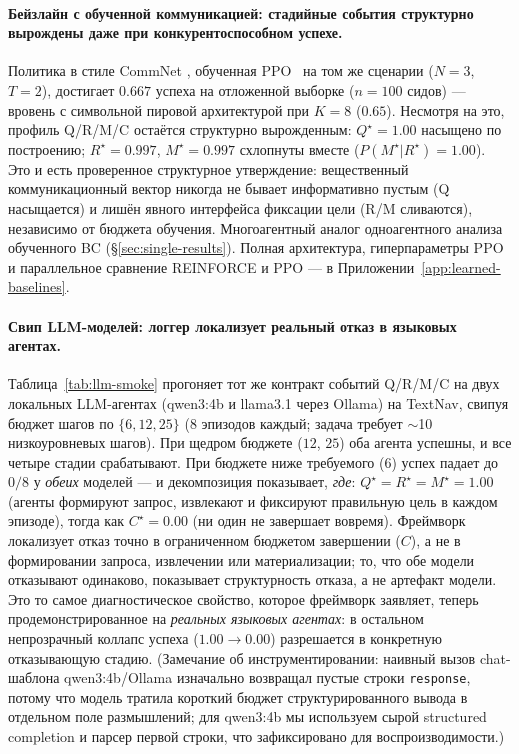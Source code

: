 \documentclass{article}
\begin{document}
\paragraph{Бейзлайн с обученной коммуникацией: стадийные события структурно вырождены даже при конкурентоспособном успехе.}
Политика в стиле CommNet \citep{sukhbaatar2016commnet}, обученная PPO~\citep{schulman2017proximal} на том же сценарии ($N{=}3$, $T{=}2$), достигает $0.667$ успеха на отложенной выборке ($n{=}100$ сидов) --- вровень с символьной пировой архитектурой при $K{=}8$ ($0.65$). Несмотря на это, профиль Q/R/M/C остаётся структурно вырожденным: $Q^\star{=}1.00$ насыщено по построению; $R^\star{=}0.997$, $M^\star{=}0.997$ схлопнуты вместе ($P(M^\star|R^\star){=}1.00$). Это и есть проверенное структурное утверждение: вещественный коммуникационный вектор никогда не бывает информативно пустым (Q насыщается) и лишён явного интерфейса фиксации цели (R/M сливаются), независимо от бюджета обучения. Многоагентный аналог одноагентного анализа обученного BC (\S\ref{sec:single-results}). Полная архитектура, гиперпараметры PPO и параллельное сравнение REINFORCE и PPO --- в Приложении~\ref{app:learned-baselines}.

\paragraph{Свип LLM-моделей: логгер локализует реальный отказ в языковых агентах.}
Таблица~\ref{tab:llm-smoke} прогоняет тот же контракт событий Q/R/M/C на двух локальных LLM-агентах (qwen3:4b и llama3.1 через Ollama) на TextNav, свипуя бюджет шагов по $\{6,12,25\}$ ($8$ эпизодов каждый; задача требует $\sim$10 низкоуровневых шагов). При щедром бюджете ($12$, $25$) оба агента успешны, и все четыре стадии срабатывают. При бюджете ниже требуемого ($6$) успех падает до $0/8$ у \emph{обеих} моделей --- и декомпозиция показывает, \emph{где}: $Q^\star{=}R^\star{=}M^\star{=}1.00$ (агенты формируют запрос, извлекают и фиксируют правильную цель в каждом эпизоде), тогда как $C^\star{=}0.00$ (ни один не завершает вовремя). Фреймворк локализует отказ точно в ограниченном бюджетом завершении ($C$), а не в формировании запроса, извлечении или материализации; то, что обе модели отказывают одинаково, показывает структурность отказа, а не артефакт модели. Это то самое диагностическое свойство, которое фреймворк заявляет, теперь продемонстрированное на \emph{реальных языковых агентах}: в остальном непрозрачный коллапс успеха ($1.00\to0.00$) разрешается в конкретную отказывающую стадию. (Замечание об инструментировании: наивный вызов chat-шаблона qwen3:4b/Ollama изначально возвращал пустые строки \texttt{response}, потому что модель тратила короткий бюджет структурированного вывода в отдельном поле размышлений; для qwen3:4b мы используем сырой structured completion и парсер первой строки, что зафиксировано для воспроизводимости.)
\end{document}
